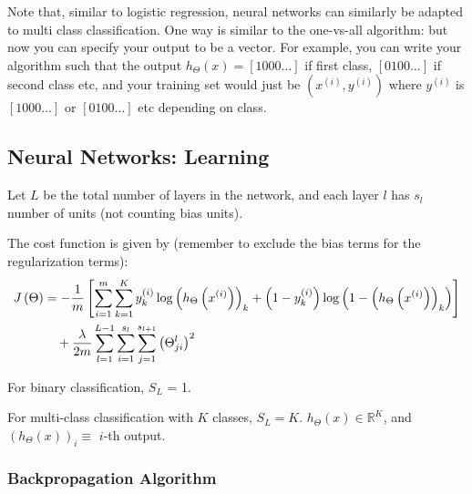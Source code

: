 \documentclass[letterpaper,10pt]{article}
\begin{document}
Note that, similar to logistic regression, neural networks can similarly be adapted to multi class classification. One way is similar to the one-vs-all algorithm: but now you can specify your output to be a vector. For example, you can write your algorithm such that the output $h_\Theta (x) = [1 0 0 0 \ldots]$ if first class, $[0 1 0 0 \ldots]$ if second class etc, and your training set would just be $(x^{(i)}, y^{(i)})$ where $y^{(i)}$ is $[1 0 0 0 \ldots]$ or $[0 1 0 0 \ldots]$ etc depending on class.

	

\subsection{Neural Networks: Learning}

Let $L$ be the total number of layers in the network, and each layer $l$ has $s_l$ number of units (not counting bias units). 

The cost function is given by (remember to exclude the bias terms for the regularization terms):
\begin{align}
J\left( \Theta \right) &= -\frac{1}{m} \left[ \sum_{i=1}^m \sum_{k=1}^K y_k^{(i)} \log \left( h_\Theta \left( x^{(i)} \right) \right)_k + \left( 1 - y_k^{(i)} \right) \log \left( 1 - \left( h_\Theta \left( x^{(i)} \right) \right)_k  \right) \right] \\
&\quad + \frac{\lambda}{2m} \sum_{l=1}^{L-1} \sum_{i=1}^{s_l} \sum_{j=1}^{s_{l+1}} \left( \Theta_{ji}^l \right)^2 \notag
\end{align}

For binary classification, $S_L$ = 1. 

For multi-class classification with $K$ classes, $S_L = K$.
$h_\Theta (x) \in \mathbb{R}^K$, and $\left( h_\Theta (x) \right)_i \equiv$ $i$-th output.

\subsubsection{Backpropagation Algorithm}
\end{document}
